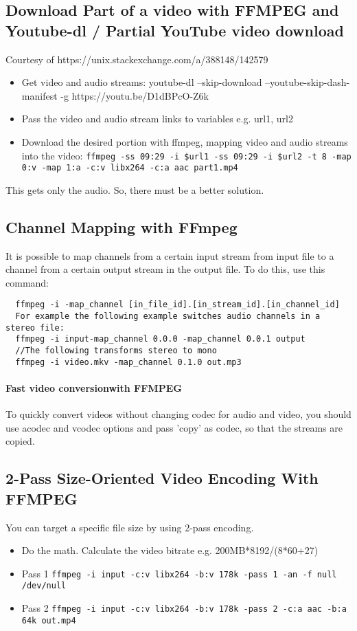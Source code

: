 \documentclass{article}
\begin{document}
\subsection{Download Part of a video with FFMPEG and Youtube-dl / Partial YouTube video download}
Courtesy of https://unix.stackexchange.com/a/388148/142579

  \begin{itemize}
    \item Get video and audio streams: youtube-dl --skip-download --youtube-skip-dash-manifest -g https://youtu.be/D1dBPcO-Z6k
    \item Pass the video and audio stream links to variables e.g. url1, url2
    \item Download the desired portion with ffmpeg, mapping video and audio streams into the video: \lstinline{ffmpeg -ss 09:29 -i $url1 -ss 09:29 -i $url2 -t 8 -map 0:v -map 1:a -c:v libx264 -c:a aac part1.mp4}
  \end{itemize}
  
  This gets only the audio. So, there must be a better solution. 

  

\subsection{Channel Mapping with FFmpeg}
It is possible to map channels from a certain input stream from input file to a channel from a certain output stream in the output file. To do this, use this command:

\begin{verbatim}
  ffmpeg -i -map_channel [in_file_id].[in_stream_id].[in_channel_id]
  For example the following example switches audio channels in a stereo file:
  ffmpeg -i input-map_channel 0.0.0 -map_channel 0.0.1 output
  //The following transforms stereo to mono
  ffmpeg -i video.mkv -map_channel 0.1.0 out.mp3
\end{verbatim}

\paragraph*{Fast video conversionwith FFMPEG}
To quickly convert videos without changing codec for audio and video, you should use acodec and vcodec options and pass 'copy' as codec, so that the streams are copied.

\subsection{2-Pass Size-Oriented Video Encoding With FFMPEG}
You can target a specific file size by using 2-pass encoding. 
\begin{itemize}
  \item Do the math. Calculate the video bitrate e.g. 200MB*8192/(8*60+27)
  \item Pass 1 \lstinline{ffmpeg -i input -c:v libx264 -b:v 178k -pass 1 -an -f null /dev/null}
  \item Pass 2 \lstinline{ffmpeg -i input -c:v libx264 -b:v 178k -pass 2 -c:a aac -b:a 64k out.mp4}
\end{itemize}
\end{document}
